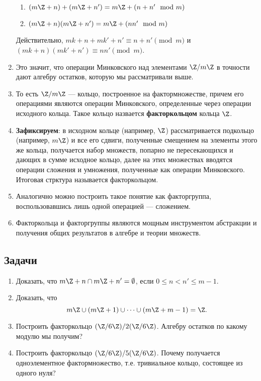 \begin{enumerate}
\begin{enumerate}[Z1]
\item $(m\Z+n)+(m\Z+n') = m\Z+(n+n'\mod m)$
\item $(m\Z+n)(m\Z+n') = m\Z+(nn'\mod m)$
\end{enumerate}
Действительно, $mk+n+mk'+n'\equiv n+n'\pmod m$ и $(mk+n)(mk'+n')\equiv nn'\pmod m$.
\item Это значит, что операции Минковского над элементами $\Z/m\Z$ в точности дают алгебру остатков, которую мы рассматривали выше.
\item То есть $\Z/m\Z$ --- кольцо, построенное на фактормножестве, причем его операциями являются операции Минковского, определенные через операции исходного кольца. Такое кольцо назвается \textbf{факторкольцом} кольца $\Z$.
\item \textbf{Зафиксируем}: в исходном кольце (например, $\Z$) рассматривается подкольцо (например, $m\Z$) и все его сдвиги, полученные смещением на элементы этого же кольца, получается набор множеств, попарно не пересекающихся и дающих в сумме исходное кольцо, далее на этих множествах вводятся операции сложения и умножения, полученные как операции Минковского. Итоговая стрктура называется факторкольцом.
\item Аналогично можно построить такое понятие как факторгруппа, воспользовавшись лишь одной операцией --- сложением.
\item Факторкольца и факторгруппы являются мощным инструментом абстракции и получения общих результатов в алгебре и теории множеств.
\end{enumerate}


\subsection*{Задачи}
\begin{enumerate}
\item Доказать, что $m\Z+n\cap m\Z+n'=\emptyset$, если $0\le n<n'\le m-1$.
\item Доказать, что
$$
m\Z\cup (m\Z+1)\cup\dots\cup (m\Z+m-1) = \Z.
$$
\item Построить факторкольцо $(\Z/6\Z)/2(\Z/6\Z)$. Алгебру остатков по какому модулю мы получим?
\item Построить факторкольцо $(\Z/6\Z)/5(\Z/6\Z)$. Почему получается одноэлементное фактормножество, т.е. тривиальное кольцо, состоящее из одного нуля?
\end{enumerate}





